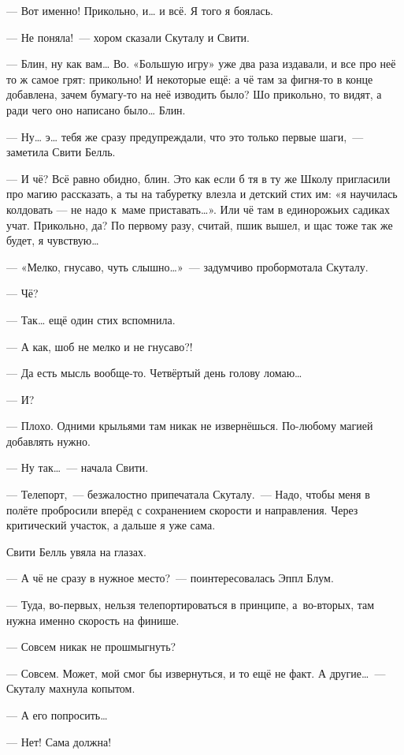 \documentclass[fontsize=11pt,a5paper,titlepage=firstcover]{scrbook}
\begin{document}
--- Вот именно! Прикольно, и{\ldots} и всё. Я того я боялась.

--- Не поняла!~--- хором сказали Скуталу и Свити.

--- Блин, ну как вам{\ldots} Во. «Большую игру» уже два раза издавали, и все про неё то ж самое грят: прикольно! И некоторые ещё: а чё там за фигня-то в конце добавлена, зачем бумагу-то на неё изводить было? Шо прикольно, то видят, а ради чего оно написано было{\ldots} Блин.

--- Ну{\ldots} э{\ldots} тебя же сразу предупреждали, что это только первые шаги,~--- заметила Свити Белль.

--- И чё? Всё равно обидно, блин. Это как если б тя в ту же Школу пригласили про магию рассказать, а ты на табуретку влезла и детский стих им: «я научилась колдовать --- не надо к~маме приставать{\ldots}». Или чё там в единорожьих садиках учат. Прикольно, да? По первому разу, считай, пшик вышел, и щас тоже так же будет, я чувствую{\ldots}

--- «Мелко, гнусаво, чуть слышно{\ldots}»~--- задумчиво пробормотала Скуталу.

--- Чё?

--- Так{\ldots} ещё один стих вспомнила.

--- А как, шоб не мелко и не гнусаво?!

--- Да есть мысль вообще-то. Четвёртый день голову ломаю{\ldots}

--- И?

--- Плохо. Одними крыльями там никак не извернёшься. По-любому магией добавлять нужно.

--- Ну так{\ldots}~--- начала Свити.

--- Телепорт,~--- безжалостно припечатала Скуталу.~--- Надо, чтобы меня в полёте пробросили вперёд с сохранением скорости и направления. Через критический участок, а дальше я уже сама.

Свити Белль увяла на глазах.

--- А чё не сразу в нужное место?~--- поинтересовалась Эппл Блум.

--- Туда, во-первых, нельзя телепортироваться в принципе, а~во-вторых, там нужна именно скорость на финише.

--- Совсем никак не прошмыгнуть?

--- Совсем. Может, мой смог бы извернуться, и то ещё не факт. А другие{\ldots}~--- Скуталу махнула копытом.

--- А его попросить{\ldots}

--- Нет! Сама должна!
\end{document}
